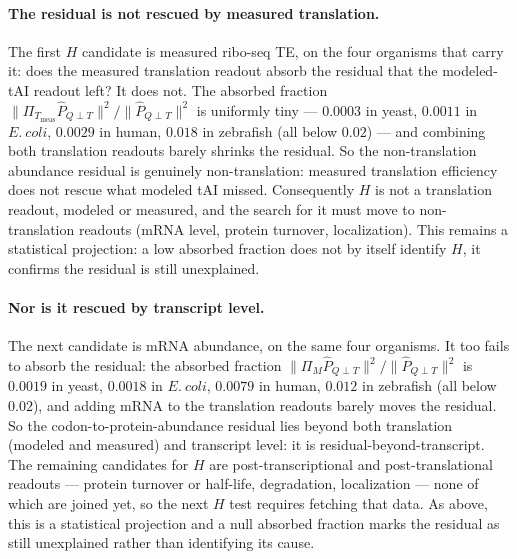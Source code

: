 \paragraph{The residual is not rescued by measured translation.}
The first $H$ candidate is measured ribo-seq TE, on the four organisms that carry it: does the measured translation readout absorb the residual that the modeled-tAI readout left?  It does not.  The absorbed fraction $\lVert\Pi_{T_{\mathrm{meas}}}\widehat P_{Q\perp T}\rVert^2/\lVert\widehat P_{Q\perp T}\rVert^2$ is uniformly tiny --- $0.0003$ in yeast, $0.0011$ in $E.\ coli$, $0.0029$ in human, $0.018$ in zebrafish (all below $0.02$) --- and combining both translation readouts barely shrinks the residual.  So the non-translation abundance residual is genuinely non-translation: measured translation efficiency does not rescue what modeled tAI missed.  Consequently $H$ is not a translation readout, modeled or measured, and the search for it must move to non-translation readouts (mRNA level, protein turnover, localization).  This remains a statistical projection: a low absorbed fraction does not by itself identify $H$, it confirms the residual is still unexplained.

\paragraph{Nor is it rescued by transcript level.}
The next candidate is mRNA abundance, on the same four organisms.  It too fails to absorb the residual: the absorbed fraction $\lVert\Pi_{M}\widehat P_{Q\perp T}\rVert^2/\lVert\widehat P_{Q\perp T}\rVert^2$ is $0.0019$ in yeast, $0.0018$ in $E.\ coli$, $0.0079$ in human, $0.012$ in zebrafish (all below $0.02$), and adding mRNA to the translation readouts barely moves the residual.  So the codon-to-protein-abundance residual lies beyond both translation (modeled and measured) and transcript level: it is residual-beyond-transcript.  The remaining candidates for $H$ are post-transcriptional and post-translational readouts --- protein turnover or half-life, degradation, localization --- none of which are joined yet, so the next $H$ test requires fetching that data.  As above, this is a statistical projection and a null absorbed fraction marks the residual as still unexplained rather than identifying its cause.
